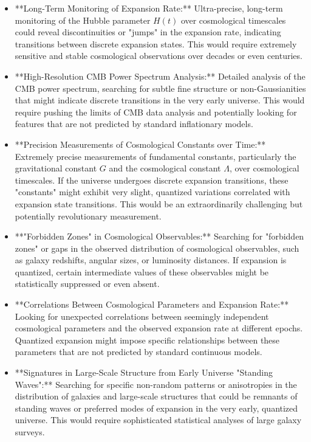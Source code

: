\documentclass[12pt,a4paper]{article}
\begin{document}
	\begin{itemize}
		\item **Long-Term Monitoring of Expansion Rate:**  Ultra-precise, long-term monitoring of the Hubble parameter $H(t)$ over cosmological timescales could reveal discontinuities or "jumps" in the expansion rate, indicating transitions between discrete expansion states.  This would require extremely sensitive and stable cosmological observations over decades or even centuries.
		\item **High-Resolution CMB Power Spectrum Analysis:**  Detailed analysis of the CMB power spectrum, searching for subtle fine structure or non-Gaussianities that might indicate discrete transitions in the very early universe.  This would require pushing the limits of CMB data analysis and potentially looking for features that are not predicted by standard inflationary models.
		\item **Precision Measurements of Cosmological Constants over Time:**  Extremely precise measurements of fundamental constants, particularly the gravitational constant $G$ and the cosmological constant $\Lambda$, over cosmological timescales.  If the universe undergoes discrete expansion transitions, these "constants" might exhibit very slight, quantized variations correlated with expansion state transitions.  This would be an extraordinarily challenging but potentially revolutionary measurement.
		\item **"Forbidden Zones" in Cosmological Observables:**  Searching for "forbidden zones" or gaps in the observed distribution of cosmological observables, such as galaxy redshifts, angular sizes, or luminosity distances.  If expansion is quantized, certain intermediate values of these observables might be statistically suppressed or even absent.
		\item **Correlations Between Cosmological Parameters and Expansion Rate:**  Looking for unexpected correlations between seemingly independent cosmological parameters and the observed expansion rate at different epochs.  Quantized expansion might impose specific relationships between these parameters that are not predicted by standard continuous models.
		\item **Signatures in Large-Scale Structure from Early Universe "Standing Waves":**  Searching for specific non-random patterns or anisotropies in the distribution of galaxies and large-scale structures that could be remnants of standing waves or preferred modes of expansion in the very early, quantized universe.  This would require sophisticated statistical analyses of large galaxy surveys.
	\end{itemize}
	
\end{document}
